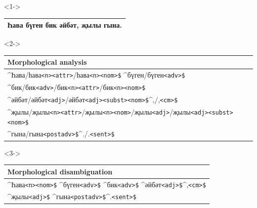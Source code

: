 \documentclass[10pt,xetex]{beamer} %
\newcommand{\atag}[1]{{\scriptsize{\texttt{#1}}}}
\begin{document}
\begin{frame}[fragile]


\begin{onlyenv}<1->
\fontsize{9pt}{11.2}\selectfont
  \begin{tabular*}{\textwidth}{l}
  \hline
  \hline
   Һава бүген бик әйбәт, җылы гына. \\ 
  \hline
  \end{tabular*}
\end{onlyenv}

\begin{onlyenv}<2->
\fontsize{9pt}{11.2}\selectfont
  \begin{tabular*}{\textwidth}{l}
  {\bf Morphological analysis} \\
  \hline
   \^{}Һава/һава\atag{<n>}\atag{<attr>}/һава\atag{<n>}\atag{<nom>\$} \^{}бүген/бүген\atag{<adv>\$}  \\
                \^{}бик/бик\atag{<adv>}/бик\atag{<n>}\atag{<attr>}/бик\atag{<n>}\atag{<nom>\$} \\ 
                \^{}әйбәт/әйбәт\atag{<adj>}/әйбәт\atag{<adj>}\atag{<subst>}\atag{<nom>\$}\^{},/,\atag{<cm>\$} \\ 
                \^{}җылы/җылы\atag{<n>}\atag{<attr>}/җылы\atag{<n>}\atag{<nom>}/җылы\atag{<adj>}/җылы\atag{<adj>}\atag{<subst>}\atag{<nom>\$} \\
                \^{}гына/гына\atag{<postadv>\$}\^{}./.\atag{<sent>\$} \\
  \hline
  \end{tabular*}
\end{onlyenv}

\begin{onlyenv}<3->
\fontsize{9pt}{11.2}\selectfont
  \begin{tabular*}{\textwidth}{l}
  {\bf Morphological disambiguation} \\
  \hline
   \^{}Һава\atag{<n>}\atag{<nom>\$} \^{}бүген\atag{<adv>\$} \^{}бик\atag{<adv>\$} \^{}әйбәт\atag{<adj>\$}\^{},\atag{<cm>\$} \\ 
                \^{}җылы\atag{<adj>\$} \^{}гына\atag{<postadv>\$}\^{}.\atag{<sent>\$}\\
  \hline
  \end{tabular*}
\end{onlyenv}


\end{frame}
\end{document}
